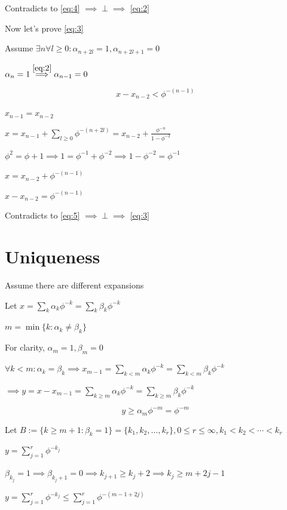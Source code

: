 \documentclass{article}
\begin{document}
Contradicts to \eqref{eq:4} \( \implies \perp \implies \) \eqref{eq:2}

Now let's prove \eqref{eq:3}

Assume \( \exists n \forall l\geq 0: \alpha_{n+2l} = 1, \alpha_{n+2l + 1} = 0 \)

\( \alpha_n = 1 \overset{\eqref{eq:2}}{\implies} \alpha_{n-1} = 0 \)

\[x - x_{n-2} < \phi^{-(n-1)} \tag{5}\label{eq:5}\]

\( x_{n-1} = x_{n-2} \)

\( x = x_{n-1} + \sum_{l \geq 0}\phi^{-(n+2l)} = x_{n-2} + \frac{\phi^{-n}}{1-\phi^{-2}} \)

\( \phi^2 = \phi + 1 \implies 1 = \phi^{-1} + \phi^{-2} \implies 1 - \phi^{-2} = \phi^{-1} \)

\( x = x_{n-2} + \phi^{-(n-1)} \)

\( x - x_{n-2} = \phi^{-(n-1)} \)

Contradicts to \eqref{eq:5} \( \implies \perp \implies \) \eqref{eq:3}

\section*{Uniqueness}

Assume there are different expansions

Let \( x = \sum_k \alpha_k \phi^{-k} = \sum_k \beta_k \phi^{-k} \)

\( m = \min \{k: \alpha_k \neq \beta_k \} \)

For clarity, \( \alpha_m = 1, \beta_m = 0 \)

\( \forall k<m: \alpha_k = \beta_k \implies x_{m-1} = \sum_{k<m} \alpha_k \phi^{-k} = \sum_{k<m} \beta_k \phi^{-k} \)

\( \implies y = x - x_{m-1} = \sum_{k \geq m} \alpha_k \phi^{-k} = \sum_{k \geq m} \beta_k \phi^{-k} \)

\[y \geq \alpha_{m} \phi^{-m} = \phi^{-m} \tag{6}\label{eq:6}\]

Let \( B := \{ k \geq m + 1: \beta_k = 1 \} = \{ k_1, k_2, \ldots, k_r \}, 0 \leq r \leq \infty, k_1 < k_2 < \cdots < k_r \)

\( y = \sum_{j = 1}^r \phi^{-k_j} \)

\( \beta_{k_j} = 1 \implies \beta_{k_j+1} = 0 \implies k_{j+1} \geq k_j + 2 \implies k_j \geq m + 2j - 1 \)

\( y = \sum_{j = 1}^r \phi^{-k_j} \leq \sum_{j = 1}^r \phi^{-(m-1+2j)} \)
\end{document}

